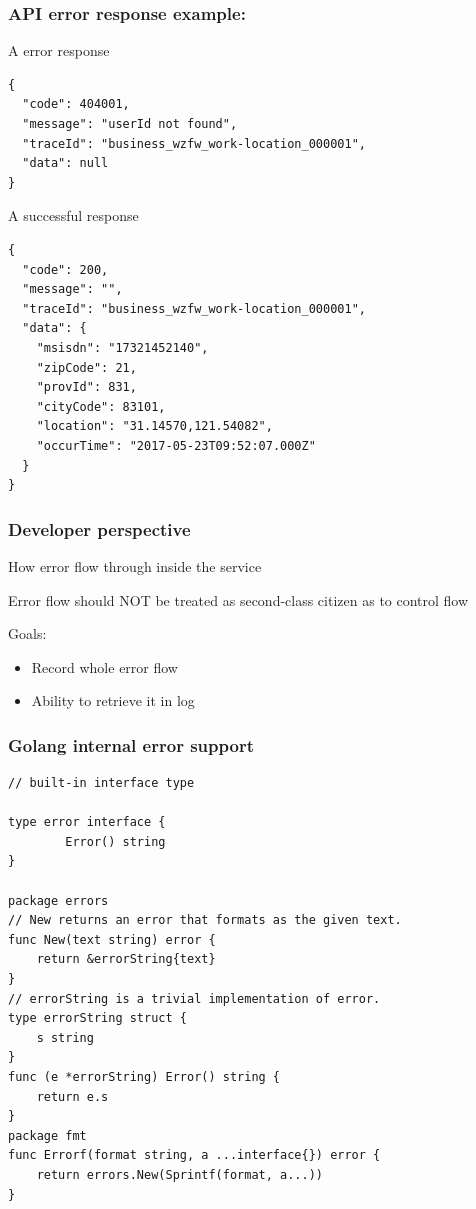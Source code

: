 \documentclass[9pt]{beamer}
\begin{document}
\begin{frame}[fragile]
\frametitle{API error response example: }


A error response


\begin{verbatim}
{
  "code": 404001,
  "message": "userId not found",
  "traceId": "business_wzfw_work-location_000001",
  "data": null
}

\end{verbatim}

A successful response


\begin{verbatim}
{
  "code": 200,
  "message": "",
  "traceId": "business_wzfw_work-location_000001",
  "data": {
    "msisdn": "17321452140",
    "zipCode": 21,
    "provId": 831,
    "cityCode": 83101,
    "location": "31.14570,121.54082",
    "occurTime": "2017-05-23T09:52:07.000Z"
  }
}

\end{verbatim}


\end{frame}

\begin{frame}[fragile]
\frametitle{Developer perspective}


How error flow through inside the service  


Error flow should NOT be treated as second-class citizen as to control flow


Goals:


\begin{itemize}
\item Record whole error flow
\item Ability to retrieve it in log
\end{itemize}


\end{frame}

\begin{frame}[fragile]
\frametitle{Golang internal error support}


\begin{verbatim}
// built-in interface type

type error interface {
        Error() string
}

package errors
// New returns an error that formats as the given text.
func New(text string) error {
	return &errorString{text}
}
// errorString is a trivial implementation of error.
type errorString struct {
	s string
}
func (e *errorString) Error() string {
	return e.s
}
package fmt
func Errorf(format string, a ...interface{}) error {
	return errors.New(Sprintf(format, a...))
}

\end{verbatim}


\end{frame}
\end{document}
